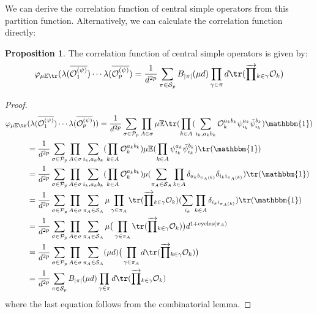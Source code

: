 \documentclass[a4paper,11pt]{article}
\theoremstyle{definition}
\numberwithin{equation}{section}
\newtheorem{proposition}{Proposition}[section]
\begin{document}
We can derive the correlation function of central simple operators from this partition function. Alternatively, we can calculate the correlation function directly:
\begin{proposition}
    The correlation function of central simple operators is given by:
    \begin{equation}
        \varphi_{\mu\mathbb{E}\tr}(\lambda(\overline{\mathcal{O}^{(\psi)}_1})\cdots\lambda(\overline{\mathcal{O}_p^{(\psi)}}) = \frac{1}{d^{2p}}\sum_{\pi\in\mathcal{S}_p}B_{|\pi|}(\mu d)\prod_{\gamma\in\pi}d\tr(\overrightarrow{\prod}_{k\in\gamma}\mathcal{O}_k)
    \end{equation}
\end{proposition}
\begin{proof}
    \begin{align}
        \begin{split}
            \varphi_{\mu\mathbb{E}\tr}&(\lambda(\overline{\mathcal{O}^{(\psi)}_1})\cdots\lambda(\overline{\mathcal{O}^{(\psi)}_p})) = \frac{1}{d^{2p}}\sum_{\sigma\in\mathcal{P}_p}\prod_{A\in\sigma}\mu\mathbb{E}\tr(\prod_{k\in A}(\sum_{i_k,a_kb_k}\mathcal{O}^{a_kb_k}_k\psi^{a_k}_{i_k}\bar{\psi}^{b_k}_{i_k})\mathbbm{1})
            \\
            &=\frac{1}{d^{2p}}\sum_{\sigma\in\mathcal{P}_p}\prod_{A\in\sigma}\sum_{i_k, a_kb_k}(\prod_{k\in A}\mathcal{O}^{a_kb_k}_k)\mu\mathbb{E}(\prod_{k\in A}\psi^{a_k}_{i_k}\bar{\psi}^{b_k}_{i_k})\tr(\mathbbm{1})
            \\&
            =\frac{1}{d^{2p}}\sum_{\sigma\in\mathcal{P}_p}\prod_{A\in\sigma}\sum_{i_k,a_kb_k}(\prod_{k\in A}\mathcal{O}^{a_kb_k}_k)\mu(\sum_{\pi_A\in\mathcal{S}_A}\prod_{k\in A}\delta_{a_kb_{\pi_A(k)}}\delta_{i_k i_{\pi_A(k)}})\tr(\mathbbm{1})
            \\&
            =\frac{1}{d^{2p}}\sum_{\sigma\in\mathcal{P}_p}\prod_{A\in\sigma}\sum_{\pi_A\in\mathcal{S}_A}\mu\prod_{\gamma\in\pi_A}\tr(\overrightarrow{\prod}_{k\in\gamma}\mathcal{O}_k)(\sum_{i_k}\prod_{k\in A}\delta_{i_ki_{\pi_A(k)}})\tr(\mathbbm{1})
            \\&
            =\frac{1}{d^{2p}}\sum_{\sigma\in\mathcal{P}_p}\prod_{A\in\sigma}\sum_{\pi_A\in\mathcal{S}_A}\mu\big(\prod_{\gamma\in\pi_A}\tr(\overrightarrow{\prod}_{k\in\gamma}\mathcal{O}_k)\big)d^{1 + \text{cycles}(\pi_A)}
            \\&
            =\frac{1}{d^{2p}}\sum_{\sigma\in\mathcal{P}_p}\prod_{A\in\sigma}\sum_{\pi_A\in\mathcal{S}_A}(\mu d)\big(\prod_{\gamma\in\pi_A}d\tr(\overrightarrow{\prod}_{k\in\gamma}\mathcal{O}_k)\big)
            \\&
            =\frac{1}{d^{2p}}\sum_{\pi\in\mathcal{S}_p}B_{|\pi|}(\mu d)\prod_{\gamma\in\pi}d\tr(\overrightarrow{\prod}_{k\in\gamma}\mathcal{O}_k)
        \end{split}
    \end{align}
    where the last equation follows from the combinatorial lemma. 
\end{proof}
\end{document}
